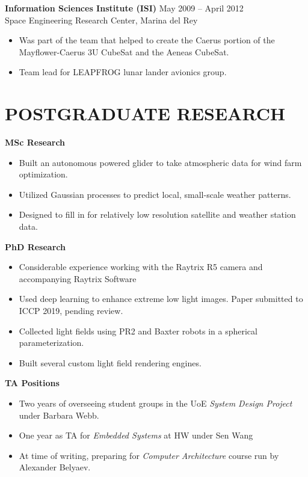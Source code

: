 \documentclass[10pt]{res} %
\begin{document}
\begin{resume}
\textbf{Information Sciences Institute (ISI)} \hfill May 2009 -- April 2012 \\
Space Engineering Research Center, Marina del Rey 
\begin{itemize}\itemsep -2pt
\item Was part of the team that helped to create the Caerus portion of the Mayflower-Caerus 3U CubeSat and the Aeneas CubeSat.
\item Team lead for LEAPFROG lunar lander avionics group.
\end{itemize}
\vspace*{-\baselineskip}

\section{POSTGRADUATE RESEARCH}
\textbf{MSc Research}
\begin{itemize} \itemsep -2pt
\item Built an autonomous powered glider to take atmospheric data for wind farm optimization.
\item Utilized Gaussian processes to predict local, small-scale weather patterns.
\item Designed to fill in for relatively low resolution satellite and weather station data.
\end{itemize}
\vspace*{-\baselineskip}

\textbf{PhD Research}
\begin{itemize} \itemsep -2pt
\item Considerable experience working with the Raytrix R5 camera and accompanying Raytrix Software
\item Used deep learning to enhance extreme low light images. Paper submitted to ICCP 2019, pending review.
\item Collected light fields using PR2 and Baxter robots in a spherical parameterization. 
\item Built several custom light field rendering engines.
\end{itemize}
\vspace*{-\baselineskip}

\textbf{TA Positions}
\begin{itemize} \itemsep -2pt
\item Two years of overseeing student groups in the UoE \emph{System Design Project} under Barbara Webb.
\item One year as TA for \emph{Embedded Systems} at HW under Sen Wang
\item At time of writing, preparing for \emph{Computer Architecture} course run by Alexander Belyaev.
\end{itemize}
\vspace*{-\baselineskip}


\end{resume}
\end{document}

